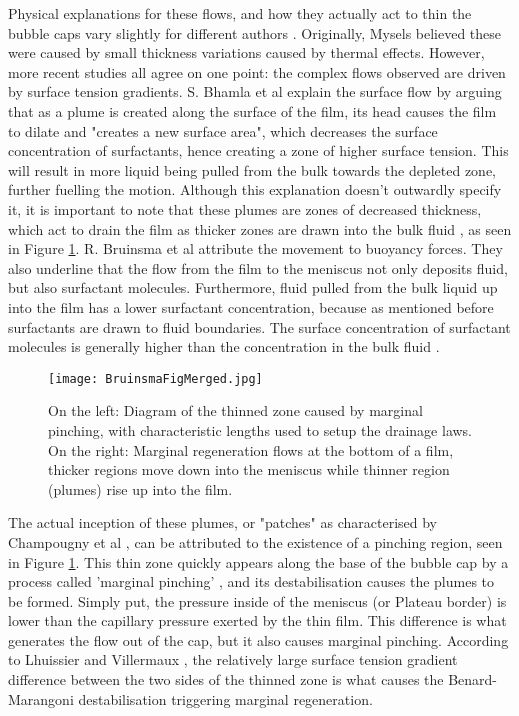 \documentclass[a4paper,12pt]{article}
\numberwithin{equation}{section}
\numberwithin{figure}{section}
\numberwithin{table}{section}
\begin{document}
Physical explanations for these flows, and how they actually act to thin the bubble caps vary slightly for different authors \cite{Nierstrasz1999, Bhamla2017, Lhuissier2011, ChampougnyNotBare2016, Bruinsma1995}. Originally, Mysels \cite{Mysels1959Book} believed these were caused by small thickness variations caused by thermal effects. However, more recent studies all agree on one point: the complex flows observed are driven by surface tension gradients. S. Bhamla et al \cite{Bhamla2017} explain the surface flow by arguing that as a plume is created along the surface of the film, its head causes the film to dilate and "creates a new surface area", which decreases the surface concentration of surfactants, hence creating a zone of higher surface tension. This will result in more liquid being pulled from the bulk towards the depleted zone, further fuelling the motion. Although this explanation doesn't outwardly specify it, it is important to note that these plumes are zones of decreased thickness, which act to drain the film as thicker zones are drawn into the bulk fluid \cite{Lhuissier2011, Nierstrasz1999}, as seen in Figure \ref{fig:BruinsmaMerge}. R. Bruinsma et al \cite{Bruinsma1995} attribute the movement to buoyancy forces. They also underline that the flow from the film to the meniscus not only deposits fluid, but also surfactant molecules. Furthermore, fluid pulled from the bulk liquid up into the film has a lower surfactant concentration, because as mentioned before surfactants are drawn to fluid boundaries. The surface concentration of surfactant molecules is generally higher than the concentration in the bulk fluid \cite{Gast1997}.

\begin{figure}[!htbp]
    \centering
    \captionsetup{width=.9\linewidth}
    \texttt{[image: BruinsmaFigMerged.jpg]}
    \caption{On the left: Diagram of the thinned zone caused by marginal pinching, with characteristic lengths used to setup the drainage laws. On the right: Marginal regeneration flows at the bottom of a film, thicker regions move down into the meniscus while thinner region (plumes) rise up into the film. \cite{Bruinsma1995}}
    \label{fig:BruinsmaMerge}
\end{figure}

The actual inception of these plumes, or "patches" as characterised by Champougny et al \cite{ChampougnyEvap2018}, can be attributed to the existence of a pinching region, seen in Figure \ref{fig:BruinsmaMerge}. This thin zone quickly appears along the base of the bubble cap by a process called 'marginal pinching' \cite{Joye1994, Aradian2001}, and its destabilisation causes the plumes to be formed. Simply put, the pressure inside of the meniscus (or Plateau border) is lower than the capillary pressure exerted by the thin film. This difference is what generates the flow out of the cap, but it also causes marginal pinching. According to Lhuissier and Villermaux \cite{Lhuissier2011}, the relatively large surface tension gradient difference between the two sides of the thinned zone is what causes the Benard-Marangoni destabilisation triggering marginal regeneration.
\end{document}
